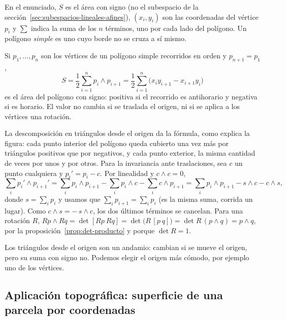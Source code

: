 En el enunciado, \(S\) es el área con signo (no el subespacio de la
sección~\ref{sec:subespacios-lineales-afines}), \((x_i,y_i)\) son las coordenadas del vértice
\(p_i\) y \(\sum\) indica la suma de los \(n\) términos, uno por cada lado del polígono. Un
polígono \emph{simple} es uno cuyo borde no se cruza a sí mismo.

\begin{proposicion}\label{prop:area-poligono}
Si \(p_1,\dots,p_n\) son los vértices de un polígono simple recorridos en orden y
\(p_{n+1}=p_1\),
\[
  S=\frac12\sum_{i=1}^{n}p_i\wedge p_{i+1}=\frac12\sum_{i=1}^{n}\bigl(x_iy_{i+1}-x_{i+1}y_i\bigr)
\]
es el área del polígono con signo: positiva si el recorrido es antihorario y negativa si es
horario. El valor no cambia si se traslada el origen, ni si se aplica a los vértices una
rotación.
\end{proposicion}

\begin{demostracion}
La descomposición en triángulos desde el origen da la fórmula, como explica la figura: cada
punto interior del polígono queda cubierto una vez más por triángulos positivos que por
negativos, y cada punto exterior, la misma cantidad de veces por unos y por otros. Para la
invariancia ante traslaciones, sea \(c\) un punto cualquiera y \(p_i'=p_i-c\). Por
linealidad y \(c\wedge c=0\),
\[
  \sum_i p_i'\wedge p_{i+1}'=\sum_i p_i\wedge p_{i+1}-\sum_i p_i\wedge c-\sum_i c\wedge p_{i+1}
  =\sum_i p_i\wedge p_{i+1}-s\wedge c-c\wedge s ,
\]
donde \(s=\sum_ip_i\) y usamos que \(\sum_ip_{i+1}=\sum_ip_i\) (es la misma suma, corrida un
lugar). Como \(c\wedge s=-\,s\wedge c\), los dos últimos términos se cancelan. Para una
rotación \(R\),
\(Rp\wedge Rq=\det[Rp\ Rq]=\det\bigl(R\,[p\ q]\bigr)=\det R\,(p\wedge q)=p\wedge q\), por la
proposición~\ref{prop:det-producto} y porque \(\det R=1\).
\end{demostracion}

\begin{idea}
Los triángulos desde el origen son un andamio: cambian si se mueve el origen, pero su suma
con signo no. Podemos elegir el origen más cómodo, por ejemplo uno de los vértices.
\end{idea}

\subsection{Aplicación topográfica: superficie de una parcela por coordenadas}\label{sec:aplicacion-superficie}

